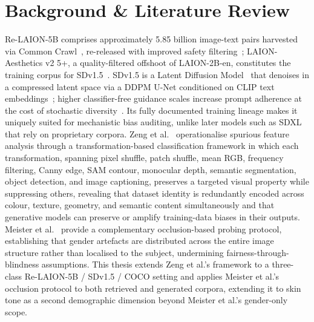 \section{Background \& Literature Review}

Re-LAION-5B comprises approximately 5.85 billion image-text pairs harvested via Common
Crawl~\cite{Schuhmann_2022_Laion5b}, re-released with improved safety
filtering~\cite{Laion_2024_Relaion5B}; LAION-Aesthetics v2 5+, a quality-filtered
offshoot of LAION-2B-en, constitutes the training corpus for
SDv1.5~\cite{Schuhmann_2022_LaionAesthetics}. SDv1.5 is a
Latent Diffusion Model~\cite{Rombach_2022_CVPR} that denoises in a compressed latent
space via a DDPM U-Net conditioned on CLIP text
embeddings~\cite{Ho_2020_DDPM,Radford_2021_CLIP}; higher classifier-free guidance scales
increase prompt adherence at the cost of stochastic diversity~\cite{Ho_2022_CFG}. Its
fully documented training lineage makes it uniquely suited for mechanistic bias auditing,
unlike later models such as SDXL~\cite{Podell_2023_SDXL} that rely on proprietary
corpora. Zeng et al.~\cite{Zeng_2024_UnderstandingBiasinLargeScaleVisualDatasets} operationalise spurious
feature analysis through a transformation-based classification framework in which each
transformation, spanning pixel shuffle, patch shuffle, mean RGB, frequency filtering,
Canny edge, SAM contour, monocular depth, semantic segmentation, object detection, and
image captioning, preserves a targeted visual property while suppressing others,
revealing that dataset identity is redundantly encoded across colour, texture, geometry,
and semantic content simultaneously and that generative models can preserve or amplify training-data biases in their outputs.
Meister et al.~\cite{Meister_2023_GenderArtifactsinVisualDatasets} provide a complementary
occlusion-based probing protocol, establishing that gender
artefacts are distributed across the entire image structure rather than localised to the
subject, undermining fairness-through-blindness assumptions. This thesis extends Zeng et
al.'s framework to a three-class Re-LAION-5B / SDv1.5 / COCO setting and applies
Meister et al.'s occlusion protocol to both retrieved and generated corpora, extending
it to skin tone as a second demographic dimension beyond Meister et al.'s gender-only
scope.

